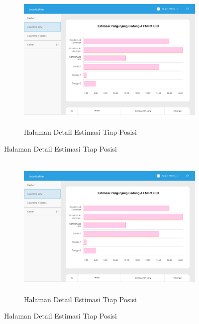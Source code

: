 \begin{enumerate}[a.]
	      \vspace{-0cm}
	      \begin{figure} [H]
		      \begin{subfigure}{.5\textwidth}
			      \centering
			      \includegraphics[width = 13cm, height= 7cm]{gambar/MacBook Pro 14_ - 5.png}
			      \caption{Halaman Detail Estimasi Tiap Posisi}
		      \end{subfigure}
	      \end{figure}

	      \vspace{-0cm}
	      \begin{figure} [H]
		      \begin{subfigure}{.5\textwidth}
			      \centering
			      \includegraphics[width = 13cm, height= 7cm]{gambar/MacBook Pro 14_ - 5.png}
			      \caption{Halaman Detail Estimasi Tiap Posisi}
		      \end{subfigure}
	      \end{figure}
\end{enumerate}

